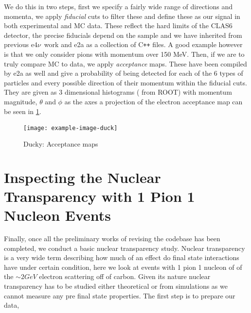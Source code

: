 \documentclass[a4paper,12pt]{article}
\newcommand{\efn}{e4$\nu$}
\newcommand{\verbb}[1]{\text{\verb|#1}}
\begin{document}
We do this in two steps, first we specify a fairly wide range of directions and momenta, we apply \emph{fiducial} cuts to filter these and define these as our signal in both experimental and MC data.
These reflect the hard limits of the CLAS6 detector, the precise fiducials depend on the sample and we have inherited from previous \efn\ work and e2a as a collection of C\texttt{++} files.
A good example however is that we only consider pions with momentum over 150 \si{MeV}.
Then, if we are to truly compare MC to data, we apply \emph{acceptance} maps.
These have been compiled by e2a as well and give a probability of being detected for each of the 6 types of particles and every possible direction of their momentum within the fiducial cuts.
They are given as 3 dimensional histograms (\verbb{TH3F} from ROOT) with momentum magnitude, $\theta$ and $\phi$ as the axes a projection of the electron acceptance map can be seen in \cref{fig:acc_map}.

\begin{figure}[h]
\centering
    \texttt{[image: example-image-duck]}
    \caption{
        Ducky: Acceptance maps
    }\label{fig:acc_map}
\end{figure}


\section{Inspecting the Nuclear Transparency with 1 Pion 1 Nucleon Events}
Finally, once all the preliminary works of revising the codebase has been completed, we conduct a basic nuclear transparency study.
Nuclear transparency is a very wide term describing how much of an effect do final state interactions have under certain condition, here we look at events with 1 pion 1 nucleon of of the $\sim 2\si{GeV}$ electron scattering off of carbon.
Given its nature nuclear transparency has to be studied either theoretical or from simulations as we cannot measure any pre final state properties.
The first step is to prepare our data, 


\printbibliography
\end{document}
